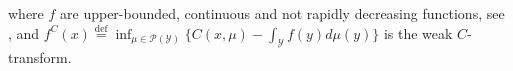 \documentclass{article} %
\DeclareMathOperator{\Dist}{Dist}
\begin{document}
\vspace{-2.5mm}where $f$ are upper-bounded, continuous and  not rapidly decreasing functions, see \citep[.2]{backhoff2019existence}, and ${f^{C}(x)\!\stackrel{\text{def}}{=}\!\inf_{\mu\in\mathcal{P}(\mathcal{Y})}\lbrace C(x,\mu)\!-\!\int_{\mathcal{Y}}f(y)d\mu(y)\rbrace}$ is the weak $C$-transform.

\end{document}
